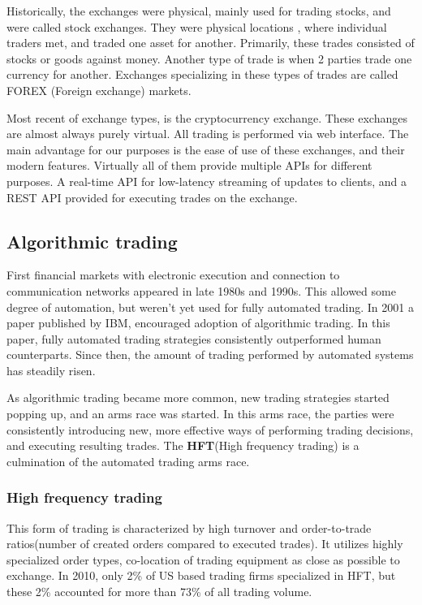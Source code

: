 Historically, the exchanges were physical, mainly used for trading stocks, and
were called stock exchanges. They were physical locations , where individual traders met, and traded one asset for another.
Primarily, these trades consisted of stocks or goods against money. Another type of trade is when 2 parties trade one currency for another.
Exchanges specializing in these types of trades are called FOREX (Foreign exchange) markets.

Most recent of exchange types, is the cryptocurrency exchange. These exchanges are almost always purely virtual. All trading is performed
via web interface. The main advantage for our purposes is the ease of use of these exchanges, and their modern features.
Virtually all of them provide multiple APIs for different purposes. A real-time API for low-latency streaming of updates to clients,
and a REST API provided for executing trades on the exchange.

\subsection{Algorithmic trading}
First financial markets with electronic execution and connection to communication networks appeared
in late 1980s and 1990s. This allowed some degree of automation, but weren't yet used for fully
automated trading. In 2001 a paper published by IBM\cite{Tesauro:2001:HBA:501158.501183},
encouraged adoption of algorithmic trading. In this paper, fully automated trading strategies
consistently outperformed human counterparts. Since then, the amount of trading performed by
automated systems has steadily risen.

As algorithmic trading became more common, new trading strategies started popping up, and
an arms race was started. In this arms race, the parties were consistently introducing new,
more effective ways of performing trading decisions, and executing resulting trades. The \textbf{HFT}(High frequency trading)
is a culmination of the automated trading arms race.

\subsubsection{High frequency trading}
This form of trading is characterized by high turnover and order-to-trade ratios(number of created orders compared to executed trades).
It utilizes highly specialized order types, co-location of trading equipment as close as possible to exchange.
In 2010, only 2\% of US based trading firms specialized in HFT, but these 2\% accounted for more than 73\% of all
trading volume\cite{article:computerized_trading}.

